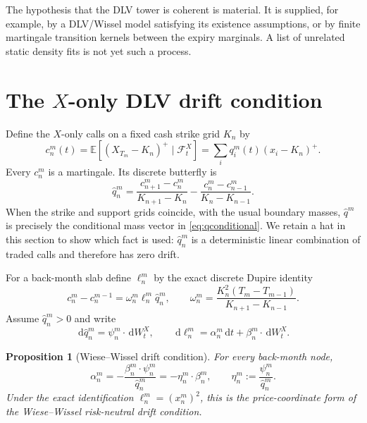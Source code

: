 \documentclass[11pt,a4paper]{article}
\newtheorem{proposition}[theorem]{Proposition}
\newcommand{\E}{\mathbb E}
\newcommand{\F}{\mathcal F}
\newcommand{\dd}{\,\mathrm d}
\begin{document}
The hypothesis that the DLV tower is coherent is material.  It is supplied,
for example, by a DLV/Wissel model satisfying its existence assumptions, or by
finite martingale transition kernels between the expiry marginals.  A list of
unrelated static density fits is not yet such a process.

\section{The \texorpdfstring{$X$}{X}-only DLV drift condition}

Define the $X$-only calls on a fixed cash strike grid $K_n$ by
\begin{equation}
 c_n^m(t)=\E[(X_{T_m}-K_n)^+\mid\F_t^X]
          =\sum_iq_i^m(t)(x_i-K_n)^+ .
 \label{eq:xcall}
\end{equation}
Every $c_n^m$ is a martingale.  Its discrete butterfly is
\begin{equation}
 \widehat q_n^m=
 \frac{c_{n+1}^m-c_n^m}{K_{n+1}-K_n}
 -\frac{c_n^m-c_{n-1}^m}{K_n-K_{n-1}} .
 \label{eq:butterfly}
\end{equation}
When the strike and support grids coincide, with the usual boundary masses,
$\widehat q^m$ is precisely the conditional mass vector in
\eqref{eq:qconditional}.  We retain a hat in this section to show which fact is
used: $\widehat q_n^m$ is a deterministic linear combination of traded calls
and therefore has zero drift.

For a back-month slab define $\ell_n^m$ by the exact discrete Dupire identity
\begin{equation}
 c_n^m-c_n^{m-1}
 =\omega_n^m\ell_n^m\widehat q_n^m,
 \qquad
 \omega_n^m=
 \frac{K_n^2(T_m-T_{m-1})}{K_{n+1}-K_{n-1}}.
 \label{eq:dlvidentity}
\end{equation}
Assume $\widehat q_n^m>0$ and write
\begin{equation}
 \dd\widehat q_n^m=\psi_n^m\cdot\dd W_t^X,
 \qquad
 \dd\ell_n^m=\alpha_n^m\dd t+\beta_n^m\cdot\dd W_t^X.
 \label{eq:ellq}
\end{equation}

\begin{proposition}[Wiese--Wissel drift condition]
For every back-month node,
\begin{equation}
 \boxed{
 \alpha_n^m=-\frac{\beta_n^m\cdot\psi_n^m}{\widehat q_n^m}
            =-\eta_n^m\cdot\beta_n^m,
 \qquad \eta_n^m:=\frac{\psi_n^m}{\widehat q_n^m}.}
 \label{eq:magnus}
\end{equation}
Under the exact identification $\ell_n^m=(x_n^m)^2$, this is the
price-coordinate form of the Wiese--Wissel risk-neutral drift condition.
\end{proposition}
\end{document}
